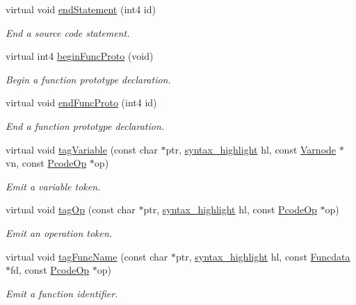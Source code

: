 \begin{DoxyCompactItemize}
virtual void \mbox{\hyperlink{class_emit_no_xml_a8b7a4a5484ac357c962cb427c760def6}{end\+Statement}} (int4 id)
\begin{DoxyCompactList}\small\item\em End a source code statement. \end{DoxyCompactList}\item 
virtual int4 \mbox{\hyperlink{class_emit_no_xml_a3ae360f835420fdb0972a9d883012252}{begin\+Func\+Proto}} (void)
\begin{DoxyCompactList}\small\item\em Begin a function prototype declaration. \end{DoxyCompactList}\item 
virtual void \mbox{\hyperlink{class_emit_no_xml_ae874ec5e673fd74f9770f90212a4e451}{end\+Func\+Proto}} (int4 id)
\begin{DoxyCompactList}\small\item\em End a function prototype declaration. \end{DoxyCompactList}\item 
virtual void \mbox{\hyperlink{class_emit_no_xml_a478e999ba828155338487ba81e97a2be}{tag\+Variable}} (const char $\ast$ptr, \mbox{\hyperlink{class_emit_xml_a7c3577436da429c3c75f4b82cac6864f}{syntax\+\_\+highlight}} hl, const \mbox{\hyperlink{class_varnode}{Varnode}} $\ast$vn, const \mbox{\hyperlink{class_pcode_op}{Pcode\+Op}} $\ast$op)
\begin{DoxyCompactList}\small\item\em Emit a variable token. \end{DoxyCompactList}\item 
virtual void \mbox{\hyperlink{class_emit_no_xml_a419f21215356676e31f3a9002377f09f}{tag\+Op}} (const char $\ast$ptr, \mbox{\hyperlink{class_emit_xml_a7c3577436da429c3c75f4b82cac6864f}{syntax\+\_\+highlight}} hl, const \mbox{\hyperlink{class_pcode_op}{Pcode\+Op}} $\ast$op)
\begin{DoxyCompactList}\small\item\em Emit an operation token. \end{DoxyCompactList}\item 
virtual void \mbox{\hyperlink{class_emit_no_xml_aad2220b0821197edc142a17e031e1b80}{tag\+Func\+Name}} (const char $\ast$ptr, \mbox{\hyperlink{class_emit_xml_a7c3577436da429c3c75f4b82cac6864f}{syntax\+\_\+highlight}} hl, const \mbox{\hyperlink{class_funcdata}{Funcdata}} $\ast$fd, const \mbox{\hyperlink{class_pcode_op}{Pcode\+Op}} $\ast$op)
\begin{DoxyCompactList}\small\item\em Emit a function identifier. \end{DoxyCompactList}\item 

\end{DoxyCompactItemize}
